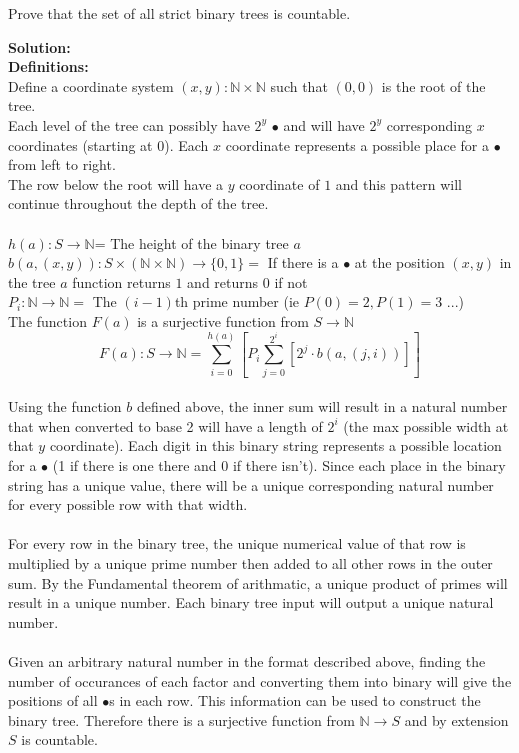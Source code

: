 \documentclass[11pt]{article}
\def\nats {{\mathbb N}}
\begin{document}
\begin{enumerate}
\begin{question}
Prove that the set of all strict binary trees is countable.
\end{question}

\begin{solution}
{\bf Solution:}\\
{\bf Definitions:}\\
Define a coordinate system $(x,y): \nats\times\nats$ such that $(0,0)$ is the root of the tree.\\
Each level of the tree can possibly have $2^y$ $\bullet$ and will have $2^y$ corresponding $x$ coordinates (starting at 0). Each $x$ coordinate represents a possible place for a $\bullet$ from left to right.\\
The row below the root will have a $y$ coordinate of $1$ and this pattern will continue throughout the depth of the tree.\\\\
$h(a): S\rightarrow \nats$= The height of the binary tree $a$ \\
$b(a, (x, y)): S\times (\nats\times\nats)\rightarrow \{0,1\} =$ If there is a $\bullet$ at the position $(x,y)$ in the tree $a$ function returns $1$ and returns $0$ if not \\
$P_i: \nats\rightarrow\nats = $ The $(i-1)$th prime number (ie $P(0) = 2, P(1) = 3$ ...)\\
The function $F(a)$ is a surjective function from $S\rightarrow \nats$\\
$$F(a): S\rightarrow \nats= \sum_{i=0}^{h(a)}\left[P_i\sum_{j=0}^{2^i}\left[2^j\cdot b(a,(j,i))\right]\right]$$\\
Using the function $b$ defined above, the inner sum will result in a natural number that when converted to base 2 will have a length of $2^i$ (the max possible width at that $y$ coordinate). Each digit in this binary string represents a possible location for a $\bullet$ (1 if there is one there and 0 if there isn't). Since each place in the binary string has a unique value, there will be a unique corresponding natural number for every possible row with that width.  \\\\
For every row in the binary tree, the unique numerical value of that row is multiplied by a unique prime number then added to all other rows in the outer sum. By the Fundamental theorem of arithmatic, a unique product of primes will result in a unique number. Each binary tree input will output a unique natural number. \\\\
Given an arbitrary natural number in the format described above, finding the number of occurances of each factor and converting them into binary will give the positions of all $\bullet$s in each row. This information can be used to construct the binary tree.
Therefore there is a surjective function from $\nats \rightarrow S$ and by extension $S$ is countable.
\end{solution}
\end{enumerate}
\end{document}
